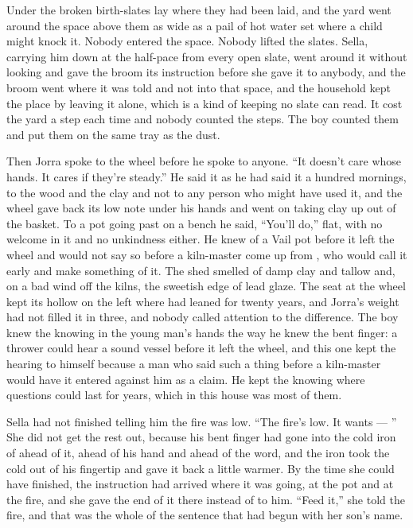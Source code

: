 Under  the broken birth-slates lay where they had been laid, and the yard went around the space above them as wide as a pail of hot water set where a child might knock it. Nobody entered the space. Nobody lifted the slates. Sella, carrying him down at the half-pace from every open slate, went around it without looking and gave the broom its instruction before she gave it to anybody, and the broom went where it was told and not into that space, and the household kept the place by leaving it alone, which is a kind of keeping no slate can read. It cost the yard a step each time and nobody counted the steps. The boy counted them and put them on the same tray as the dust.

Then Jorra spoke to the wheel before he spoke to anyone. “It doesn't care whose hands. It cares if they're steady.” He said it as he had said it a hundred mornings, to the wood and the clay and not to any person who might have used it, and the wheel gave back its low note under his hands and went on taking clay up out of the basket. To a pot going past on a bench he said, “You'll do,” flat, with no welcome in it and no unkindness either. He knew  of a Vail pot before it left the wheel and would not say so before a kiln-master come up from , who would call it early and make something of it. The shed smelled of damp clay and tallow and, on a bad wind off the kilns, the sweetish edge of lead glaze. The seat at the wheel kept its hollow on the left where  had leaned for twenty years, and Jorra's weight had not filled it in three, and nobody called attention to the difference. The boy knew the knowing in the young man's hands the way he knew the bent finger: a thrower could hear a sound vessel before it left the wheel, and this one kept the hearing to himself because a man who said such a thing before a kiln-master would have it entered against him as a claim. He kept the knowing where questions could last for years, which in this house was most of them.

\scenebreak

Sella had not finished telling him the fire was low. “The fire's low. It wants --- ” She did not get the rest out, because his bent finger had gone into the cold iron of  ahead of it, ahead of his hand and ahead of the word, and the iron took the cold out of his fingertip and gave it back a little warmer. By the time she could have finished, the instruction had arrived where it was going, at the pot and at the fire, and she gave the end of it there instead of to him. “Feed it,” she told the fire, and that was the whole of the sentence that had begun with her son's name.

